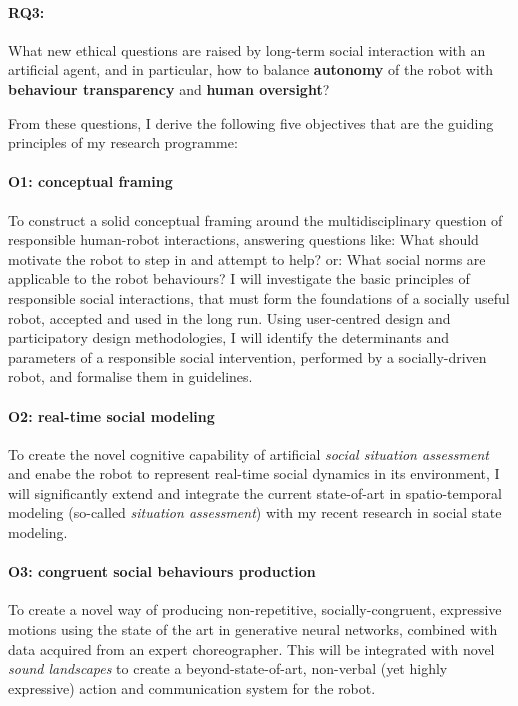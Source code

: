 \paragraph{\bf RQ3:} What new ethical questions are raised by long-term social
interaction with an artificial agent, and in particular, how to balance
\textbf{autonomy} of the robot with \textbf{behaviour transparency} and
\textbf{human oversight}?

\vspace{0.5em}
\noindent From these questions, I derive the following five objectives that are
the guiding principles of my research programme:

\paragraph{\bf O1: conceptual framing} To construct a solid conceptual framing
around the multidisciplinary question of responsible human-robot interactions,
answering questions like: What should motivate the robot to step in
and attempt to help? or: What social norms are applicable to the robot behaviours? I
will investigate the basic principles of responsible social interactions, that
must form the foundations of a socially useful robot, accepted and used in the
long run.  Using user-centred design and participatory design methodologies, I
will identify the determinants and parameters of a responsible social
intervention, performed by a socially-driven robot, and formalise them in
guidelines.

\paragraph{\bf O2: real-time social modeling} To create the novel cognitive
capability of artificial \emph{social situation assessment} and enabe the
robot to represent real-time social dynamics in its environment, I will
significantly extend and integrate the current state-of-art in spatio-temporal
modeling (so-called \emph{situation assessment}) with my recent research in social
state modeling.

\paragraph{\bf O3: congruent social behaviours production} 
To create a novel way of producing non-repetitive, socially-congruent,
expressive motions using the state of the art in generative neural networks,
combined with data acquired from an expert choreographer. This will be
integrated with novel \emph{sound landscapes} to create a beyond-state-of-art,
non-verbal (yet highly expressive) action and communication system for the
robot.

